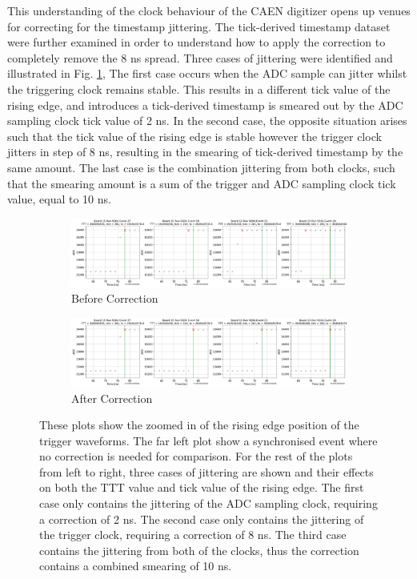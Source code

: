 This understanding of the clock behaviour of the CAEN digitizer opens up venues for correcting for the timestamp jittering.
The tick-derived timestamp dataset were further examined in order to understand how to apply the correction to completely remove the 8 ns spread.
Three cases of jittering were identified and illustrated in Fig. \ref{subfig:jitter_before},  
The first case occurs when the ADC sample can jitter whilst the triggering clock remains stable.
This results in a different tick value of the rising edge, and introduces a tick-derived timestamp is smeared out by the ADC sampling clock tick value of 2 ns.
In the second case, the opposite situation arises such that the tick value of the rising edge is stable however the trigger clock jitters in step of 8 ns, resulting in the smearing of tick-derived timestamp by the same amount.
The last case is the combination jittering from both clocks, such that the smearing amount is a sum of the trigger and ADC sampling clock tick value, equal to 10 ns.

\begin{figure}[htbp!]

\begin{subfigure}[h]{1.00\linewidth}
\centering    
\includegraphics[width=\linewidth]{jitter_before}
\caption{Before Correction}
\label{subfig:jitter_before}
\end{subfigure}

\hfill
\begin{subfigure}[h]{1.00\linewidth}
\centering    
\includegraphics[width=\linewidth]{jitter_after}
\caption{After Correction}
\label{subfig:jitter_after}
\end{subfigure}%

\caption[jitterCorr]{
These plots show the zoomed in of the rising edge position of the trigger waveforms.
The far left plot show a synchronised event where no correction is needed for comparison.
For the rest of the plots from left to right, three cases of jittering are shown and their effects on both the TTT value and tick value of the rising edge.
The first case only contains the jittering of the ADC sampling clock, requiring a correction of 2 ns.
The second case only contains the jittering of the trigger clock, requiring a correction of 8 ns.
The third case contains the jittering from both of the clocks, thus the correction contains a combined smearing of 10 ns.
}
\label{fig:jitterCorr}
\end{figure}

